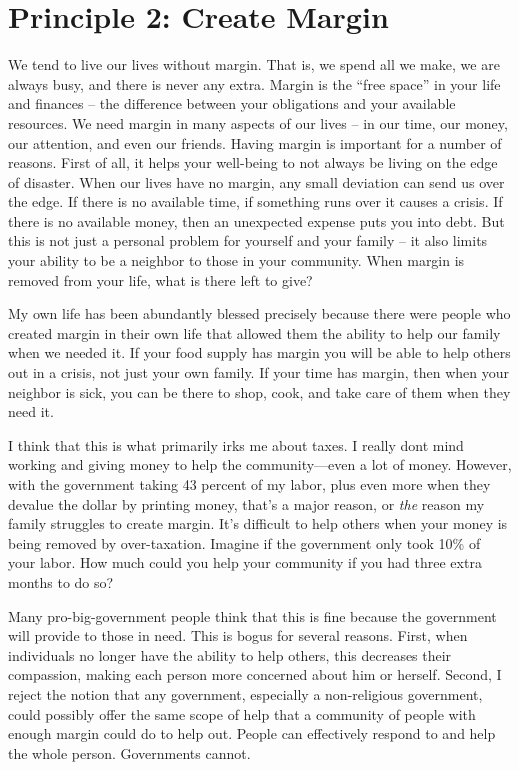 \section{Principle 2: Create Margin}

We tend to live our lives without margin. That is, we spend all we make,
we are always busy, and there is never any extra. Margin is the “free
space” in your life and finances – the difference between your
obligations and your available resources.  We need margin in many
aspects of our lives – in our time, our money, our attention, and even
our friends.  Having margin is important for a number of reasons. 
First of all, it helps your well-being to not always be living on the
edge of disaster.  When our lives have no margin, any small deviation
can send us over the edge.  If there is no available time, if something
runs over it causes a crisis.  If there is no available money, then an
unexpected expense puts you into debt.  But this is not just a personal
problem for yourself and your family – it also limits your ability to
be a neighbor to those in your community. 
When margin is
removed from your life, what is there left to give?  


My own life has been abundantly blessed precisely because there were
people who created margin in their own life that allowed them the
ability to help our family when we needed it. If your food supply has
margin you will be able to help others out
in a crisis, not just
your own family.  If
your time has margin, then when your neighbor is sick, you can be there
to shop, cook, and take care of them when they need it.


I think that this is what primarily irks me about taxes. I really
don{\textquotesingle}t mind working and giving money to help the
community—even a lot of money. However, with the government taking 43
percent of my labor,
plus even more when they devalue the dollar by printing money, 
that’s a major reason,
or \textit{the
}reason my family
struggles to create margin. It’s difficult to help others when your
money is being removed by over-taxation.  Imagine if the government
only took 10\% of your labor.  How much could you help your community
if you had three extra months to do so?


Many pro-big-government people think that this is fine because the
government will provide to those in need. This is bogus for several
reasons. First, when individuals no longer have the ability to help
others, this decreases
their compassion,
making each person more concerned about him or herself.  Second, I
reject the notion that
any government,
especially a non-religious government, could possibly offer the same
scope of help that a
community of people with enough margin could do to help out. People
can effectively respond to and help the whole person. Governments
cannot. 



